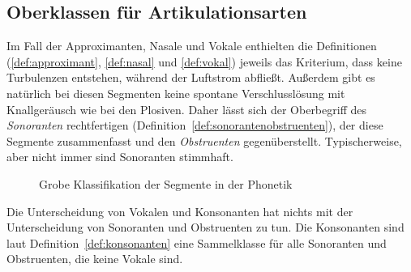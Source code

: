 \subsection{Oberklassen für Artikulationsarten}

\label{sec:oberklassenfuerartikulationsarten}

Im Fall der Approximanten, Nasale und Vokale enthielten die Definitionen (\ref{def:approximant}, \ref{def:nasal} und \ref{def:vokal}) jeweils das Kriterium, dass keine Turbulenzen entstehen, während der Luftstrom abfließt.
Außerdem gibt es natürlich bei diesen Segmenten keine spontane Verschlusslösung mit Knallgeräusch wie bei den Plosiven.
Daher lässt sich der Oberbegriff des \textit{Sonoranten} rechtfertigen (Definition~\ref{def:sonorantenobstruenten}), der diese Segmente zusammenfasst und den \textit{Obstruenten} gegenüberstellt.
Typischerweise, aber nicht immer sind Sonoranten stimmhaft.

\begin{figure}[!htbp]
  \centering
  \caption{Grobe Klassifikation der Segmente in der Phonetik}
  \label{fig:lautklassen}
\end{figure}


Die Unterscheidung von Vokalen und Konsonanten hat nichts mit der Unterscheidung von Sonoranten und Obstruenten zu tun.
Die Konsonanten sind laut Definition~\ref{def:konsonanten} eine Sammelklasse für alle Sonoranten und Obstruenten, die keine Vokale sind.


